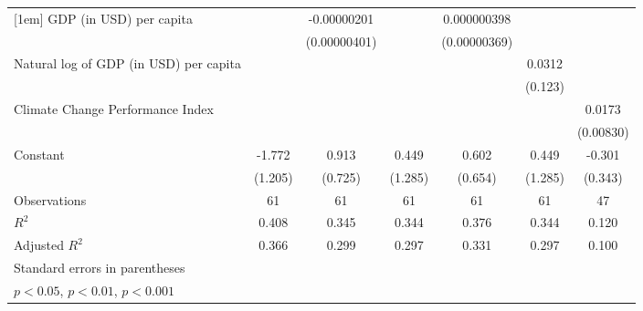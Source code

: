 {\begin{tabular}{l*{6}{c}}
[1em]
GDP (in USD) per capita&                     & -0.00000201         &                     & 0.000000398         &                     &                     \\
                    &                     &(0.00000401)         &                     &(0.00000369)         &                     &                     \\
[1em]
Natural log of GDP (in USD) per capita&                     &                     &                     &                     &      0.0312         &                     \\
                    &                     &                     &                     &                     &     (0.123)         &                     \\
[1em]
Climate Change Performance Index&                     &                     &                     &                     &                     &      0.0173         \\
                    &                     &                     &                     &                     &                     &   (0.00830)         \\
[1em]
Constant            &      -1.772         &       0.913         &       0.449         &       0.602         &       0.449         &      -0.301         \\
                    &     (1.205)         &     (0.725)         &     (1.285)         &     (0.654)         &     (1.285)         &     (0.343)         \\
\hline
Observations        &          61         &          61         &          61         &          61         &          61         &          47         \\
\(R^{2}\)           &       0.408         &       0.345         &       0.344         &       0.376         &       0.344         &       0.120         \\
Adjusted \(R^{2}\)  &       0.366         &       0.299         &       0.297         &       0.331         &       0.297         &       0.100         \\
\hline\hline
\multicolumn{7}{l}{\footnotesize Standard errors in parentheses}\\
\multicolumn{7}{l}{\footnotesize \sym{*} \(p<0.05\), \sym{**} \(p<0.01\), \sym{***} \(p<0.001\)}\\
\end{tabular}
}
